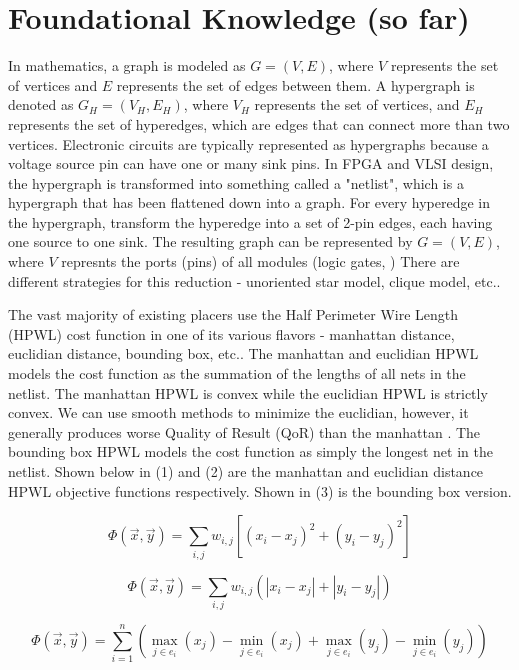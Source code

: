 \documentclass{article}
\begin{document}
\section{Foundational Knowledge (so far)}
In mathematics, a graph is modeled as \( G = (V, E) \), where \( V \) represents the set of vertices and \( E \) represents the set of edges between them.
A hypergraph is denoted as \( G_{H} = (V_{H}, E_{H}) \), where \( V_{H} \) represents the set of vertices, and \( E_{H} \) represents the set of hyperedges, which are edges that can connect more than two vertices.
Electronic circuits are typically represented as hypergraphs because a voltage source pin can have one or many sink pins. 
In FPGA and VLSI design, the hypergraph is transformed into something called a "netlist", which is a hypergraph that has been flattened down into a graph. 
For every hyperedge in the hypergraph, transform the hyperedge into a set of 2-pin edges, each having one source to one sink.
The resulting graph can be represented by \( G = (V, E) \), where \( V \) represnts the ports (pins) of all modules (logic gates, )
There are different strategies for this reduction - unoriented star model, clique model, etc.. 
\cite{AP_2000}

The vast majority of existing placers use the Half Perimeter Wire Length (HPWL) cost function in one of its various flavors - manhattan distance, euclidian distance, bounding box, etc..
The manhattan and euclidian HPWL models the cost function as the summation of the lengths of all nets in the netlist. 
The manhattan HPWL is convex while the euclidian HPWL is strictly convex.
We can use smooth methods to minimize the euclidian, however, it generally produces worse Quality of Result (QoR) than the manhattan \cite{AP_2012}.
The bounding box HPWL models the cost function as simply the longest net in the netlist.
Shown below in (1) and (2) are the manhattan and euclidian distance HPWL objective functions respectively.
Shown in (3) is the bounding box version.

\begin{equation}
    \Phi(\vec{x}, \vec{y}) = \sum_{i,j} w_{i,j} \left[ (x_i - x_j)^2 + (y_i - y_j)^2 \right]
    \label{eq:}
\end{equation}

\begin{equation}
    \Phi(\vec{x}, \vec{y}) = \sum_{i,j} w_{i,j} \left( |x_i - x_j| + |y_i - y_j| \right)
    \label{eq:}
\end{equation}

\begin{equation}
    \Phi(\vec{x}, \vec{y}) = \sum_{i=1}^{n} \left( \max_{j \in e_i} (x_j) - \min_{j \in e_i} (x_j) + \max_{j \in e_i} (y_j) - \min_{j \in e_i} (y_j) \right)
    \label{eq:}
\end{equation}
\end{document}
